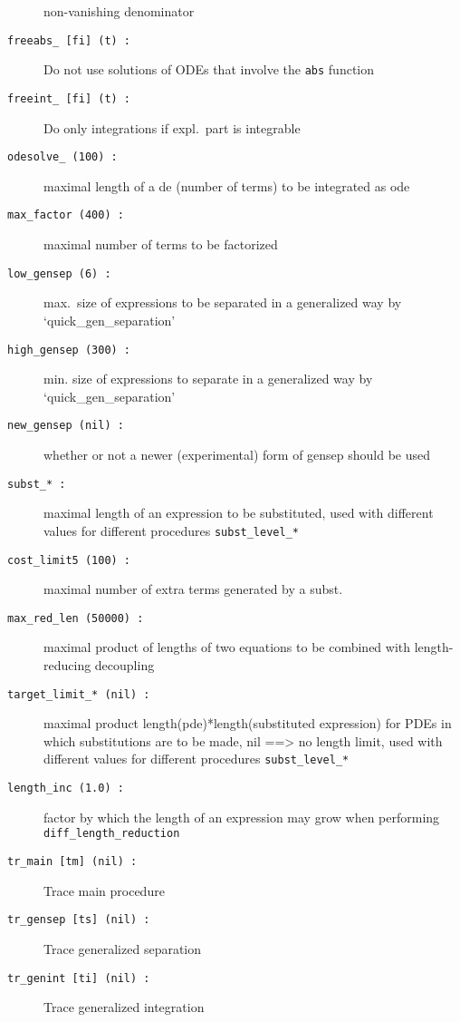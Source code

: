\documentclass[12pt]{article}
\begin{document}
\begin{description}
                    non-vanishing denominator
\item[{\tt freeabs\_ [fi] (t) :}] Do not use solutions of ODEs that
                    involve the {\tt abs} function
\item[{\tt freeint\_ [fi] (t) :}] Do only integrations if expl.\ part
                    is integrable 
\item[{\tt odesolve\_ (100) :}] maximal length of a de (number of terms) to be
                    integrated as ode
\item[{\tt max\_factor (400) :}] maximal number of terms to be factorized
\item[{\tt low\_gensep (6) :}] max.\ size of expressions to be separated in a 
                    generalized way by `quick\_gen\_separation'
\item[{\tt high\_gensep (300) :}] min. size of expressions to separate in a 
                    generalized way by `quick\_gen\_separation'
\item[{\tt new\_gensep (nil) :}] whether or not a newer (experimental)
                    form of gensep should be used
\item[{\tt subst\_* :}] maximal length of an expression to be substituted,
                    used with different values for different
                    procedures {\tt subst\_level\_*}
\item[{\tt cost\_limit5 (100) :}] maximal number of extra terms
                    generated by a subst.
\item[{\tt max\_red\_len (50000) :}] maximal product of lengths of two 
                    equations to be combined with length-reducing decoupling
\item[{\tt target\_limit\_* (nil) :}] maximal product
                    length(pde)*length(substituted expression) for
                    PDEs in which substitutions are to be made,
                    nil ==> no length limit,
                    used with different values for different
                    procedures {\tt subst\_level\_*}
\item[{\tt length\_inc (1.0) :}] factor by which the length of an 
                    expression may grow when performing 
                    {\tt diff\_length\_reduction}
\item[{\tt tr\_main [tm] (nil) :}] Trace main procedure
\item[{\tt tr\_gensep [ts] (nil) :}] Trace generalized separation
\item[{\tt tr\_genint [ti] (nil) :}] Trace generalized integration

\end{description}
\end{document}
